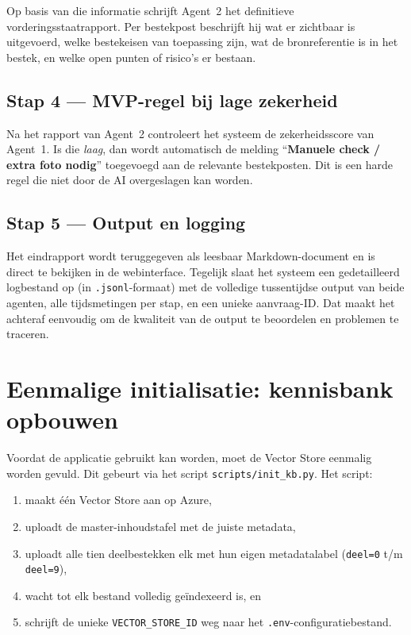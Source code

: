 \documentclass[a4paper,11pt]{article}
\begin{document}
Op basis van die informatie schrijft Agent~2 het definitieve
vorderingsstaatrapport. Per bestekpost beschrijft hij wat er zichtbaar
is uitgevoerd, welke bestekeisen van toepassing zijn, wat de bronreferentie
is in het bestek, en welke open punten of risico's er bestaan.

\subsection{Stap 4 --- MVP-regel bij lage zekerheid}

Na het rapport van Agent~2 controleert het systeem de zekerheidsscore van
Agent~1. Is die \emph{laag}, dan wordt automatisch de melding
``\textbf{Manuele check / extra foto nodig}'' toegevoegd aan de relevante
bestekposten. Dit is een harde regel die niet door de AI overgeslagen kan
worden.

\subsection{Stap 5 --- Output en logging}

Het eindrapport wordt teruggegeven als leesbaar Markdown-document en is
direct te bekijken in de webinterface. Tegelijk slaat het systeem een
gedetailleerd logbestand op (in \texttt{.jsonl}-formaat) met de volledige
tussentijdse output van beide agenten, alle tijdsmetingen per stap, en
een unieke aanvraag-ID. Dat maakt het achteraf eenvoudig om de kwaliteit
van de output te beoordelen en problemen te traceren.

\section{Eenmalige initialisatie: kennisbank opbouwen}

Voordat de applicatie gebruikt kan worden, moet de Vector Store eenmalig
worden gevuld. Dit gebeurt via het script \texttt{scripts/init\_kb.py}.
Het script:
\begin{enumerate}
    \item maakt één Vector Store aan op Azure,
    \item uploadt de master-inhoudstafel met de juiste metadata,
    \item uploadt alle tien deelbestekken elk met hun eigen metadatalabel
          (\texttt{deel=0} t/m \texttt{deel=9}),
    \item wacht tot elk bestand volledig geïndexeerd is, en
    \item schrijft de unieke \texttt{VECTOR\_STORE\_ID} weg naar het
          \texttt{.env}-configuratiebestand.
\end{enumerate}
\end{document}
